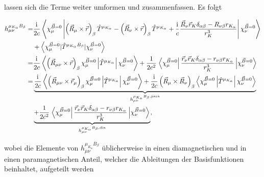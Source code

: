     lassen sich die Terme weiter umformen und zusammenfassen. Es folgt
    
    \begin{equation}\label{eq:hmunudmudb}
    \begin{aligned}    
    h_{\mu\nu}^{\mu_{K_\alpha}B_\beta}=&\frac{\mathrm{i}\mkern1mu}{2c}\left\langle\chi_\mu^{\vec{B}=0}\left\vert\left(\vec{R}_\mu\times\vec{r}\right)_\beta\hat{T}^{\mu_{K_\alpha}}-\left(\vec{R}_\nu\times\vec{r}\right)_\beta \hat{T}^{\mu_{K_\alpha}}+\frac{\mathrm{i}\mkern1mu}{c}\frac{\vec{R}_\nu\vec{r}_K\delta_{\alpha\beta}-R_{\nu \beta}r_{K_\alpha}}{r_K^3}\right\vert\chi_\nu^{\vec{B}=0}\right\rangle\\
    &+\left\langle\chi_\mu^{\vec{B}=0}\vert\hat{T}^{\mu_{K_\alpha}B_\beta}\vert\chi_\nu^{\vec{B}=0}\right\rangle\\
    =&\frac{\mathrm{i}\mkern1mu}{2c}\left\langle\left(\vec{R}_{\mu\nu}\times\vec{r}\right)_\beta\chi_\mu^{\vec{B}=0}\left\vert\hat{T}^{\mu_{K_\alpha}}\right\vert\chi_\nu^{\vec{B}=0}\right\rangle+\frac{1}{2c^2}\left.\left\langle\chi_\mu^{\vec{B}=0}\right\vert\frac{\vec{r}_\nu\vec{r}_K\delta_{\alpha\beta}-r_{\nu \beta}r_{K_\alpha}}{r_K^3}\left\vert\chi_\nu^{\vec{B}=0}\right\rangle\right.\\
    =&\underbrace{\frac{\mathrm{i}\mkern1mu}{2c}\left\langle\left(\vec{R}_{\mu\nu}\times\vec{r}_\mu\right)_\beta\chi_\mu^{\vec{B}=0}\left\vert\hat{T}^{\mu_{K_\alpha}}\right\vert\chi_\nu^{\vec{B}=0}\right\rangle +\frac{\mathrm{i}\mkern1mu}{2c}\left(\vec{R}_{\mu}\times\vec{R}_\nu\right)_\beta\left\langle\chi_\mu^{\vec{B}=0}\left\vert\hat{T}^{\mu_{K_\alpha}}\right\vert\chi_\nu^{\vec{B}=0}\right\rangle}_{h_{\mu\nu}^{\mu_{K_\alpha}B_\beta,\textrm{para}}} \\
    &\underbrace{+\frac{1}{2c^2}\left.\left\langle\chi_\mu^{\vec{B}=0}\right\vert\frac{\vec{r}_\nu\vec{r}_K\delta_{\alpha\beta}-r_{\nu \beta}r_{K_\alpha}}{r_K^3}\left\vert\chi_\nu^{\vec{B}=0}\right\rangle\right.}_{h_{\mu\nu}^{\mu_{K_\alpha}B_\beta,\textrm{dia}}},
    \end{aligned}
    \end{equation}
     
     wobei die Elemente von $h_{\mu\nu}^{\mu_{K_\alpha}B_\beta}$ üblicherweise in einen diamagnetischen und in einen paramagnetischen Anteil, welcher die Ableitungen der Basisfunktionen beinhaltet, aufgeteilt werden
     
